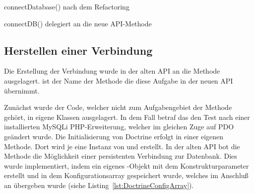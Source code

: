 \begin{listing}[H]
\caption{connectDatabase() nach dem Refactoring}
\label{lst:connectDatabaseAfterRefactoring}
\end{listing}

\begin{listing}[H]
\caption{connectDB() delegiert an die neue API-Methode}
\label{lst:connectDBcallsConnectDatabase()}
\end{listing}

\subsection{Herstellen einer Verbindung}
Die Erstellung der Verbindung wurde in der alten API an die Methode  ausgelagert.  ist der Name der Methode die diese Aufgabe in der neuen API übernimmt.

Zunächst wurde der Code, welcher nicht zum Aufgabengebiet der Methode gehört, in eigene Klassen ausgelagert. In dem Fall betraf das den Test nach einer installierten MySQLi PHP-Erweiterung, welcher im gleichen Zuge auf PDO geändert wurde. Die Initialisierung von Doctrine erfolgt in einer eigenen Methode. Dort wird je eine Instanz von \phpinline{\Doctrine\DBAL\Configuration} und \phpinline{\Doctrine\DBAL\Schema\Schema} erstellt. In der alten API bot die Methode die Möglichkeit einer persistenten Verbindung zur Datenbank. Dies wurde implementiert, indem ein eigenes -Objekt mit dem Konstrukturparameter  erstellt und in dem Konfigurationsarray gespeichert wurde, welches im Anschluß an  übergeben wurde (siehe Listing~\ref{lst:DoctrineConfigArray}).

